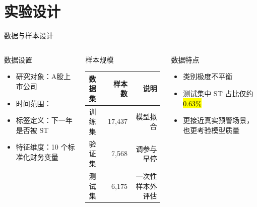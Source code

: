 \section{实验设计}

\begin{frame}{数据与样本设计}
  \begin{columns}[T,onlytextwidth]
    \begin{block}{数据设置}
      \begin{itemize}
        \item 研究对象：A股上市公司
        \item 时间范围：
        \item 标签定义：下一年是否被 ST
        \item 特征维度：10 个标准化财务变量
      \end{itemize}
    \end{block}

    \begin{exampleblock}{样本规模}
      \begin{tabular}{@{}lrr@{}}
        \toprule
        数据集 & 样本数 & 说明 \\
        \midrule
        训练集 & 17,437 & 模型拟合 \\
        验证集 & 7,568 & 调参与早停 \\
        测试集 & 6,175 & 一次性样本外评估 \\
        \bottomrule
      \end{tabular}
    \end{exampleblock}

    \begin{alertblock}{数据特点}
      \begin{itemize}
        \item 类别极度不平衡
        \item 测试集中 ST 占比仅约 \hl{0.63\%}
        \item 更接近真实预警场景，也更考验模型质量
      \end{itemize}
    \end{alertblock}
  \end{columns}
\end{frame}

